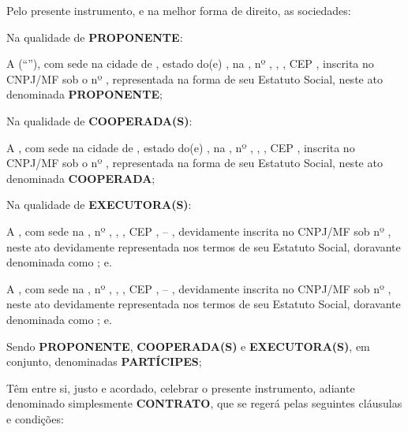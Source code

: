 Pelo presente instrumento, e na melhor forma de direito, as sociedades:

Na qualidade de \textbf{PROPONENTE}:

A \textbf{\NomeContratante} (“\textbf{\NomeContratanteResumido}”), com sede na cidade de \CidadeEnderecoContratante, estado do(e) \EstadoEnderecoContratante, na \EnderecoContratante, nº \numeroEnderecoContratante, \ComplementoEnderecoContratante, \BairroContratante, CEP \CEPContratante, inscrita no CNPJ/MF sob o nº \NumCNPJContratante, representada na forma de seu Estatuto Social, neste ato denominada \textbf{PROPONENTE};

Na qualidade de \textbf{COOPERADA(S)}:

A \textbf{\NomeCooperada}, com sede na cidade de \CidadeEnderecoCooperada, estado do(e) \EstadoEnderecoCooperada, na \EnderecoCooperada, nº \numeroEnderecoCooperada, \ComplementoEnderecoCooperada, \BairroCooperada, CEP \CEPCooperada, inscrita no CNPJ/MF sob o nº \NumCNPJCooperada, representada na forma de seu Estatuto Social, neste ato denominada \textbf{COOPERADA};

Na qualidade de \textbf{EXECUTORA(S)}:

A \textbf{\NomeExecutoraA}, com sede na \EnderecoExecutoraA, nº \numeroEnderecoExecutoraA, \ComplementoEnderecoExecutoraA, \BairroExecutoraA, CEP \CEPExecutoraA, \CidadeEnderecoExecutoraA – \EstadoEnderecoExecutoraA, devidamente inscrita no CNPJ/MF sob nº \NumCNPJExecutoraA, neste ato devidamente representada nos termos de seu Estatuto Social, doravante denominada como \textbf{\NomeExecutoraAResumido}; e.

A \textbf{\NomeExecutoraB}, com sede na \EnderecoExecutoraB, nº \numeroEnderecoExecutoraB, \ComplementoEnderecoExecutoraB, \BairroExecutoraB, CEP \CEPExecutoraB, \CidadeEnderecoExecutoraB – \EstadoEnderecoExecutoraB, devidamente inscrita no CNPJ/MF sob nº \NumCNPJExecutoraB, neste ato devidamente representada nos termos de seu Estatuto Social, doravante denominada como \textbf{\NomeExecutoraBResumido}; e.

Sendo \textbf{PROPONENTE}, \textbf{COOPERADA(S)} e \textbf{EXECUTORA(S)}, em conjunto, denominadas \textbf{PARTÍCIPES};

Têm entre si, justo e acordado, celebrar o presente instrumento, adiante denominado simplesmente \textbf{CONTRATO}, que se regerá pelas seguintes cláusulas e condições: